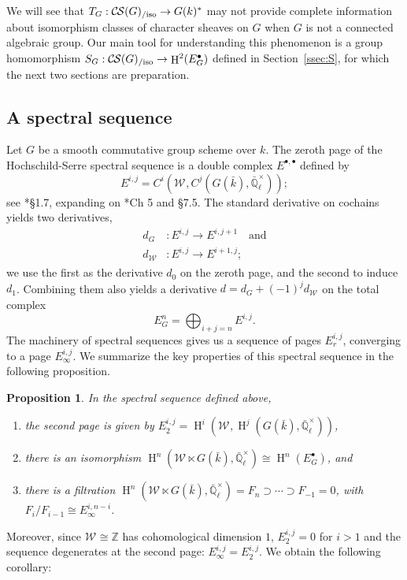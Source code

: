 \documentclass[10pt]{amsart}
\theoremstyle{plain}
\newtheorem{proposition}[theorem]{Proposition}
\theoremstyle{definition}
\theoremstyle{remark}
\newcommand{\ZZ}{{\mathbb{Z}}}
\newcommand{\EE}{\mathbb{\bar Q}_\ell}
\newcommand{\bFq}{\bar{k}}
\newcommand{\Fq}{k}
\newcommand{\EEx}{\EE^\times}
\newcommand{\Weil}[1]{\mathcal{W}_{#1}}
\DeclareMathOperator{\Hh}{H}
\newcommand{\TrFrob}[1]{T_{#1}}
\newcommand{\CS}{{\mathcal{C\hskip-0.8pt S}}}
\newcommand{\CSiso}[1]{\CS(#1)_{/\text{iso}}}
\begin{document}
We will see that $\TrFrob{G} : \CSiso{G} \to G(\Fq)^*$ may not provide complete
information about isomorphism classes of character sheaves on $G$ when $G$ is not a connected algebraic group.
Our main tool for understanding this phenomenon
is a group homomorphism $S_G: \CSiso{G} \to \Hh^2(E^\bullet_G)$ defined in Section~\ref{ssec:S}, for which the next two sections are preparation.

\subsection{A spectral sequence}\label{ssec:E}

Let $G$ be a smooth commutative group scheme over $\Fq$.
The zeroth page of the Hochschild-Serre spectral sequence
is a double complex $E^{\bullet, \bullet}$ defined by
\[
E^{i,j} = C^i(\Weil{}, C^j(G(\bFq), \EEx));
\]
see \cite{vakil:Algebraic_Geometry}*{\S 1.7}, expanding on \cite{weibel:Homological_Algebra}*{Ch 5 and \S 7.5}.
The standard derivative on cochains yields two derivatives,
\begin{align*}
d_G &: E^{i,j} \to E^{i,j+1} \quad \mbox{and} \\
d_{\Weil{}} &: E^{i,j} \to E^{i+1,j};
\end{align*}
we use the first as the derivative $d_0$ on the zeroth page, and the second to induce $d_1$.
Combining them also yields a derivative $d = d_G + (-1)^j d_{\Weil{}}$ on the total complex
\[
E^n_G = \bigoplus_{i+j=n} E^{i,j}.
\]
The machinery of spectral sequences gives us a sequence of pages $E_r^{i,j}$, converging to a page $E_{\infty}^{i,j}$. We summarize the key properties of this spectral sequence in the following proposition.

\begin{proposition} In the spectral sequence defined above,
\begin{enumerate}
\item the second page is given by $E_2^{i,j} = \Hh^i(\Weil{}, \Hh^j(G(\bFq), \EEx))$,
\item there is an isomorphism $\Hh^n(\Weil{} \ltimes G(\bFq), \EEx) \cong \Hh^n(E_G^\bullet)$, and
\item there is a filtration $\Hh^n(\Weil{} \ltimes G(\bFq), \EEx) = F_n \supset \cdots \supset F_{-1} = 0$, with $F_i / F_{i-1} \cong E_{\infty}^{i, n-i}$.
\end{enumerate}
\end{proposition}

Moreover, since $\Weil{} \cong \ZZ$ has cohomological dimension $1$, $E_2^{i,j} = 0$ for $i > 1$ and the sequence degenerates at the second page: $E_{\infty}^{i,j} = E_2^{i,j}$. We obtain the following corollary:
\end{document}
